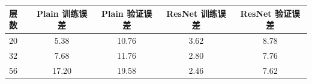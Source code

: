 \begin{tabular}{lcccc}
\toprule
层数 & Plain 训练误差 & Plain 验证误差 & ResNet 训练误差 & ResNet 验证误差 \\
\midrule
20 & 5.38 & 10.76 & 3.62 & 8.78 \\
32 & 7.68 & 11.76 & 2.80 & 7.76 \\
56 & 17.20 & 19.58 & 2.46 & 7.62 \\
\bottomrule
\end{tabular}
